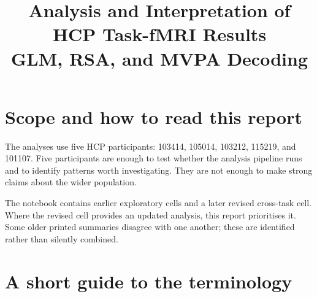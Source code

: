 \documentclass[11pt,a4paper]{article}
\title{Analysis and Interpretation of HCP Task-fMRI Results\\
\large GLM, RSA, and MVPA Decoding}
\author{}
\date{}
\begin{document}
\maketitle

\section{Scope and how to read this report}

The analyses use five HCP participants: 103414, 105014, 103212, 115219, and 101107. Five participants are enough to test whether the analysis pipeline runs and to identify patterns worth investigating. They are not enough to make strong claims about the wider population.

The notebook contains earlier exploratory cells and a later revised cross-task cell. Where the revised cell provides an updated analysis, this report prioritises it. Some older printed summaries disagree with one another; these are identified rather than silently combined.

\section{A short guide to the terminology}
\end{document}
